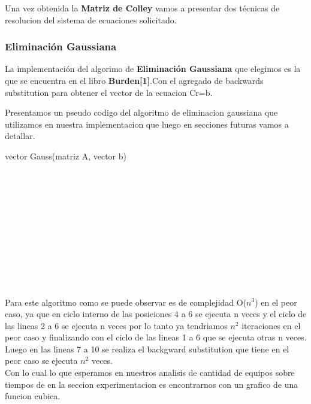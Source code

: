 Una vez obtenida la \textbf{Matriz de Colley} vamos a  presentar dos técnicas de resolucion del sistema de ecuaciones solicitado.\\

\subsubsection{Eliminación Gaussiana}
La implementación del algorimo de \textbf{Eliminación Gaussiana} que elegimos es la que se encuentra en el libro \textbf{Burden[1]}.Con el agregado de backwards substitution para obtener el vector de la ecuacion Cr=b.

Presentamos un pseudo codigo del algoritmo de eliminacion gaussiana que utilizamos en nuestra implementacion que luego en secciones futuras vamos a detallar.

\begin{algorithm}
    \begin{algorithmic}[1]\parskip=2mm
        \caption{vector Gauss(matriz A, vector b)}
        \\
        \\
        \\
        \\
        \\
        \\
        \\
        \\
        \\
        \\
    \end{algorithmic}
\end{algorithm}

Para este algoritmo como se puede observar es de complejidad O($n^3$) en el peor caso, ya que en ciclo interno de las posiciones 4 a 6 se ejecuta n veces y el ciclo de las lineas 2 a 6 se ejecuta n veces por lo tanto ya tendriamos $n^2$ iteraciones en el peor caso y finalizando con el ciclo de las lineas 1 a 6 que se ejecuta otras n veces.
Luego en las lineas 7 a 10 se realiza el backgward substitution  que tiene en el peor caso se ejecuta $n^2$ veces.\\
Con lo cual lo que esperamos en nuestros analisis de cantidad de equipos sobre tiempos de en la seccion experimentacion es encontrarnos con un grafico de una funcion cubica.

